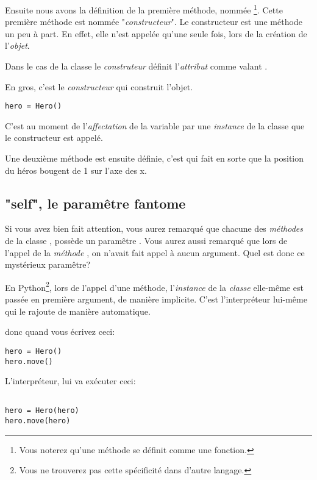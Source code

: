 Ensuite nous avons la définition de la première méthode, nommée \footnote{Vous noterez qu'une méthode se définit comme une fonction.}. Cette première méthode est nommée "\emph{constructeur}".
Le constructeur est une méthode un peu à part. En effet, elle n'est appelée qu'une seule fois, lors de la création de l'\emph{objet}.

Dans le cas de la classe  le \emph{construteur} définit l'\emph{attribut}  comme valant .

En gros, c'est le \emph{constructeur} qui construit l'objet.

\begin{lstlisting}
hero = Hero()
\end{lstlisting}

C'est au moment de l'\emph{affectation} de la variable  par une \emph{instance} de la classe  que le constructeur est appelé.

Une deuxième méthode est ensuite définie, c'est  qui fait en sorte que la position du héros bougent de 1 sur l'axe des x.


\subsection{"self", le paramêtre fantome}

Si vous avez bien fait attention, vous aurez remarqué que chacune des \emph{méthodes} de la classe , possède un paramêtre . Vous aurez aussi remarqué que lors de l'appel de la \emph{méthode} , on n'avait fait appel à aucun argument. Quel est donc ce mystérieux paramêtre?

En Python\footnote{Vous ne trouverez pas cette spécificité dans d'autre langage.}, lors de l'appel d'une méthode, l'\emph{instance} de la \emph{classe} elle-même est passée en première argument, de manière implicite. C'est l'interpréteur lui-même qui le rajoute de manière automatique.

donc quand vous écrivez ceci:
\begin{lstlisting}
hero = Hero()
hero.move()
\end{lstlisting}

L'interpréteur, lui va exécuter ceci:

\begin{lstlisting}

hero = Hero(hero)
hero.move(hero)

\end{lstlisting}


